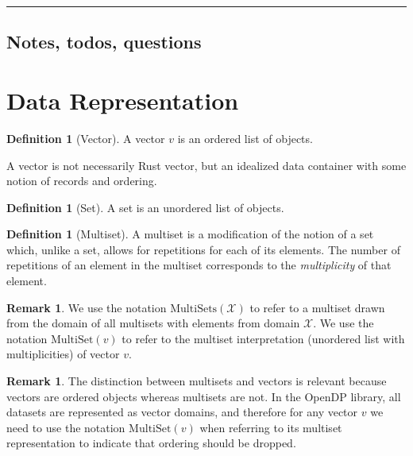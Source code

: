 \documentclass[11pt,a4paper]{article}
\theoremstyle{definition}
\newtheorem{remark}[theorem]{Remark}
\newtheorem{definition}[theorem]{Definition}
\newcommand{\horizline}{\noindent\rule{\textwidth}{1pt}}
\newcommand{\MultiSet}{\mathrm{MultiSet}}
\newcommand{\MultiSets}{\mathrm{MultiSets}}
\begin{document}

\horizline

\subsection{Notes, todos, questions}

\section{Data Representation}

\begin{definition}[Vector]
A vector $v$ is an ordered list of objects.
\end{definition}

A vector is not necessarily Rust vector, but an idealized data container with some notion of records and ordering.

\begin{definition}[Set]
A set is an unordered list of objects.
\end{definition}

\begin{definition}[Multiset]
A multiset is a modification of the notion of a set which, unlike a set, allows for repetitions for each of its elements. The number of repetitions of an element in the multiset corresponds to the \textit{multiplicity} of that element.
\end{definition}

\begin{remark}
    We use the notation $\MultiSets(\mathcal{X})$ to refer to a multiset drawn from the domain of all multisets with elements from domain $\mathcal{X}$. We use the notation $\MultiSet(v)$ to refer to the multiset interpretation (unordered list with multiplicities) of vector $v$.
\end{remark}

\begin{remark}
The distinction between multisets and vectors is relevant because vectors are ordered objects whereas multisets are not. In the OpenDP library, all datasets are represented as vector domains, and therefore for any vector $v$ we need to use the notation $\MultiSet(v)$ when referring to its multiset representation to indicate that ordering should be dropped. 
\end{remark}
\end{document}
